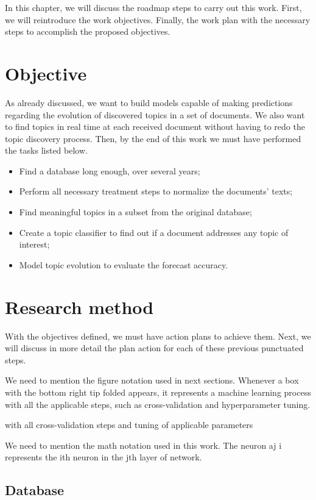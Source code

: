 In this chapter, we will discuss the roadmap steps to carry out this work. First, we will reintroduce the work objectives. Finally, the work plan with the necessary steps to accomplish the proposed objectives.

\section{Objective}

As already discussed, we want to build models capable of making predictions regarding the evolution of discovered topics in a set of documents. We also want to find topics in real time at each received document without having to redo the topic discovery process. Then, by the end of this work we must have performed the tasks listed below.

\begin{itemize}
	\item Find a database long enough, over several years;
	\item Perform all necessary treatment steps to normalize the documents' texts;
	\item Find meaningful topics in a subset from the original database;
	\item Create a topic classifier to find out if a document addresses any topic of interest;
	\item Model topic evolution to evaluate the forecast accuracy.
\end{itemize}

\section{Research method}

With the objectives defined, we must have action plans to achieve them. Next, we will discuss in more detail the plan action for each of these previous punctuated steps.

We need to mention the figure notation used in next sections. Whenever a box with the bottom right tip folded appears, it represents a machine learning process with all the applicable steps, such as cross-validation and hyperparameter tuning.

with all cross-validation steps and tuning of applicable parameters

We need to mention the math notation used in this work. The neuron aj
i represents
the ith neuron in the jth layer of network.

\subsection{Database}

